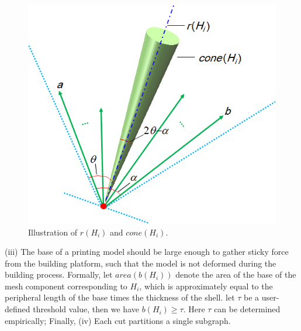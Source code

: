\begin{figure}[t]
  \centering
  \includegraphics[width=0.7\linewidth]{figs/cone.png}
  \caption{\label{fig:cone}%
           Illustration of $r(H_i)$ and $cone(H_i)$.}
\end{figure}

(iii) The base of a printing model should be large enough to gather sticky force from the building platform, such that the model is not deformed during the building process. Formally, let $area(b(H_i))$ denote the area of the base of the mesh component corresponding to $H_i$, which is approximately equal to the peripheral length of the base times the thickness of the shell. let $\tau$ be a user-defined threshold value, then we have $b(H_i) \geq \tau$. Here $\tau$ can be determined empirically; Finally,
(iv) Each cut partitions a single subgraph.

